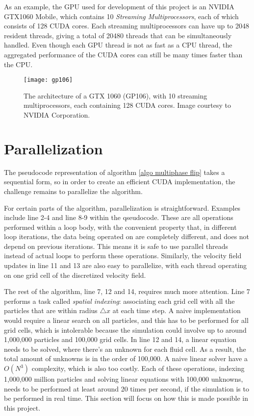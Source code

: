 As an example, the GPU used for development of this project is an NVIDIA GTX1060 Mobile, which contains 10 \textit{Streaming Multiprocessors}, each of which consists of 128 CUDA cores. Each streaming multiprocessors can have up to 2048 resident threads, giving a total of 20480 threads that can be simultaneously handled. Even though each GPU thread is not as fast as a CPU thread, the aggregated performance of the CUDA cores can still be many times faster than the CPU.


\begin{figure}[H]
    \centering
    \texttt{[image: gp106]}
    \caption{The architecture of a GTX 1060 (GP106), with 10 streaming multiprocessors, each containing 128 CUDA cores. Image courtesy to NVIDIA Corporation.}
    \label{figure GTX1060}
\end{figure}



\section{Parallelization}
The pseudocode representation of algorithm \ref{algo multiphase flip} takes a sequential form, so in order to create an efficient CUDA implementation, the challenge remains to parallelize the algorithm.

For certain parts of the algorithm, parallelization is straightforward. Examples include line 2-4 and line 8-9 within the qseudocode. These are all operations performed within a loop body, with the convenient property that, in different loop iterations, the data being operated on are completely different, and does not depend on previous iterations. This means it is safe to use parallel threads instead of actual loops to perform these operations. Similarly, the velocity field updates in line 11 and 13 are also easy to parallelize, with each thread operating on one grid cell of the discretized velocity field. 

The rest of the algorithm, line 7, 12 and 14, requires much more attention. Line 7 performs a task called \textit{spatial indexing}: associating each grid cell with all the particles that are within radius $\triangle x$ at each time step. A naive implementation would require a linear search on all particles, and this has to be performed for all grid cells, which is intolerable because the simulation could involve up to around 1,000,000 particles and 100,000 grid cells. In line 12 and 14, a linear equation needs to be solved, where there's an unknown for each fluid cell. As a result, the total amount of unknowns is in the order of 100,000. A naive linear solver have a $O(N^3)$ complexity, which is also too costly. Each of these operations, indexing 1,000,000 million particles and solving linear equations with 100,000 unknowns, needs to be performed at least around 20 times per second, if the simulation is to be performed in real time. This section will focus on how this is made possible in this project.


